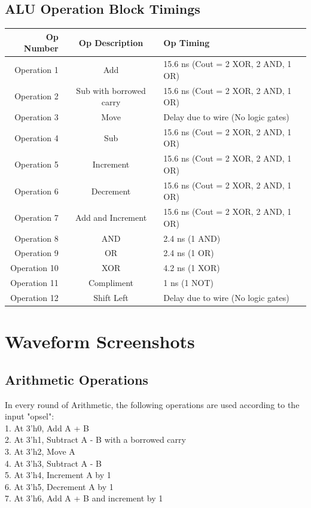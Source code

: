 \documentclass[paper=letter, fontsize=11pt]{scrartcl}
\numberwithin{equation}{section} %
\numberwithin{figure}{section} %
\numberwithin{table}{section} %
\begin{document}
\subsection{ALU Operation Block Timings}
\begin{center}
\begin{tabular}{|r|c|l|}
	\hline
	Op Number & Op Description & Op Timing\\
	\hline
	Operation 1 & Add & 15.6 ns (Cout = 2 XOR, 2 AND, 1 OR)\\
	Operation 2 & Sub with borrowed carry & 15.6 ns (Cout = 2 XOR, 2 AND, 1 OR)\\
	Operation 3 & Move & Delay due to wire (No logic gates)\\
	Operation 4 & Sub & 15.6 ns (Cout = 2 XOR, 2 AND, 1 OR)\\
	Operation 5 & Increment & 15.6 ns (Cout = 2 XOR, 2 AND, 1 OR)\\
	Operation 6 & Decrement & 15.6 ns (Cout = 2 XOR, 2 AND, 1 OR)\\
	Operation 7 & Add and Increment & 15.6 ns (Cout = 2 XOR, 2 AND, 1 OR)\\
	Operation 8 & AND & 2.4 ns (1 AND)\\
	Operation 9 & OR & 2.4 ns (1 OR)\\
	Operation 10 & XOR & 4.2 ns (1 XOR)\\
	Operation 11 & Compliment & 1 ns (1 NOT)\\
	Operation 12 & Shift Left & Delay due to wire (No logic gates)\\
	\hline
\end{tabular}
\end{center}

\section{Waveform Screenshots}

\subsection{Arithmetic Operations}
\begin{flushleft}
In every round of Arithmetic, the following operations are used according to the input "opsel": \\ [15pt]
1. At 3'h0, Add A + B\\ 
2. At 3'h1, Subtract A - B with a borrowed carry\\
3. At 3'h2, Move A\\
4. At 3'h3, Subtract A - B\\
5. At 3'h4, Increment A by 1\\
6. At 3'h5, Decrement A by 1\\
7. At 3'h6, Add A + B and increment by 1    
\end{flushleft}
\end{document}
